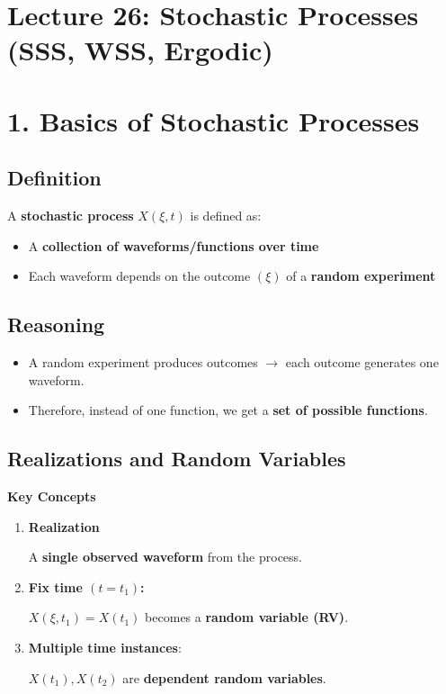 \documentclass[12pt]{article}
\begin{document}
\section*{Lecture 26: Stochastic Processes (SSS, WSS, Ergodic)}

\section*{1. Basics of Stochastic Processes}

\subsection*{Definition}

A \textbf{stochastic process} $X(\xi, t)$ is defined as:

\begin{itemize}
\item A \textbf{collection of waveforms/functions over time}
\item Each waveform depends on the outcome $(\xi)$ of a \textbf{random experiment}
\end{itemize}

\subsection*{Reasoning}

\begin{itemize}
\item A random experiment produces outcomes $\rightarrow$ each outcome generates one waveform.
\item Therefore, instead of one function, we get a \textbf{set of possible functions}.
\end{itemize}

\subsection*{Realizations and Random Variables}

\textbf{Key Concepts}

\begin{enumerate}
\item \textbf{Realization}

A \textbf{single observed waveform} from the process.

\item \textbf{Fix time $(t = t_1)$:}

$X(\xi, t_1) = X(t_1)$ becomes a \textbf{random variable (RV)}.

\item \textbf{Multiple time instances}:

$X(t_1), X(t_2)$ are \textbf{dependent random variables}.
\end{enumerate}
\end{document}
